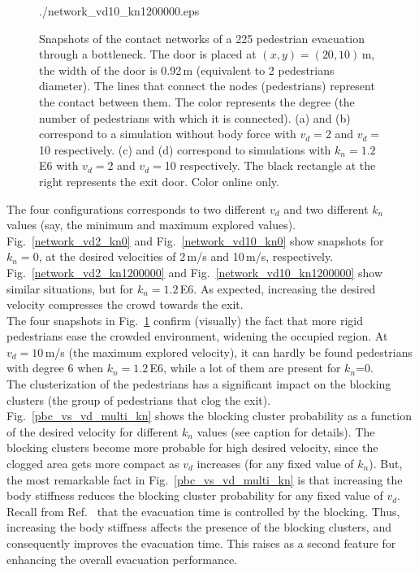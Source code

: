 \documentclass[preprint,12pt]{elsarticle}
\begin{document}
\begin{figure}[!htbp]
{{./network_vd10_kn1200000.eps}\label{network_vd10_kn1200000}}\\

\caption[width=0.47\columnwidth]{Snapshots of the contact networks of a 225
pedestrian evacuation through a bottleneck. The door is placed at
$(x,y)=(20,10)\,$m, the width of the door is 0.92$\,$m (equivalent to 2
pedestrian\textsc{}s diameter). The lines that connect the nodes
(pedestrians) represent the contact between them. The color represents the
degree (the number of pedestrians with which it is connected). (a) and (b)
correspond to a simulation without body force with $v_d=$2 and $v_d=$10
respectively. (c) and (d) correspond to simulations with $k_n=1.2\,$E6 with
$v_d=$2 and $v_d=$10 respectively. The black rectangle at the right
represents the exit door. Color online only.}
\label{network_bottleneck}
 \end{figure}

The four configurations corresponds to two different $v_d$ and two different
$k_n$ values (say, the  minimum and maximum explored values).
Fig.~\ref{network_vd2_kn0} and Fig.~\ref{network_vd10_kn0} show snapshots for
$k_n=0$, at the desired velocities of 2$\,$m/s and 10$\,$m/s, respectively.
Fig.~\ref{network_vd2_kn1200000} and Fig.~\ref{network_vd10_kn1200000} show
similar situations, but for  $k_n=1.2\,$E6. As expected, increasing the desired
velocity compresses the crowd towards the exit. \\

The four snapshots in Fig.~\ref{network_bottleneck} confirm (visually) the fact
that more rigid pedestrians ease the crowded environment, widening the occupied
region. At $v_d=10\,$m/s (the maximum explored velocity), it can hardly be found
pedestrians with degree 6 when $k_n=1.2\,$E6, while a lot of them are present
for $k_n$=0.\\

The clusterization of the pedestrians has a significant impact on the blocking
clusters (the group of pedestrians that clog the exit).
Fig.~\ref{pbc_vs_vd_multi_kn} shows the blocking cluster probability as a
function of the desired velocity for different $k_n$ values (see caption for
details). The blocking clusters become more probable for high desired velocity,
since the clogged area gets more compact as $v_d$ increases (for any fixed value
of $k_n$). But, the most remarkable fact in Fig.~\ref{pbc_vs_vd_multi_kn} is
that increasing the body stiffness reduces the blocking cluster probability for
any fixed value of $v_d$. Recall from Ref.~\cite{dorso_2005} that the evacuation
time is controlled by the blocking. Thus, increasing the body stiffness affects
the presence of the blocking clusters, and consequently improves the evacuation
time. This raises as a second feature for enhancing the overall evacuation
performance. \\
\end{document}
